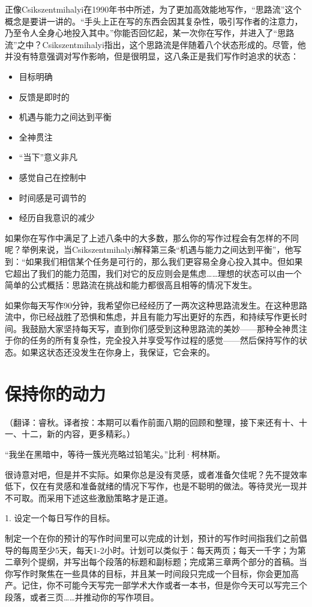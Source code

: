 \documentclass{ctexart}
\begin{document}
正像Csikszentmihalyi在1990年书中所述，为了更加高效能地写作，“思路流”这个概念是要讲一讲的。“手头上正在写的东西会因其复杂性，吸引写作者的注意力，乃至令人全身心地投入其中。”你能否回忆起，某一次你在写作，并进入了“思路流”之中？Csikszentmihalyi指出，这个思路流是伴随着八个状态形成的。尽管，他并没有特意强调对写作影响，但是很明显，这八条正是我们写作时追求的状态：

\begin{itemize}
\item 目标明确
\item 反馈是即时的
\item 机遇与能力之间达到平衡
\item 全神贯注
\item “当下”意义非凡
\item 感觉自己在控制中
\item 时间感是可调节的
\item 经历自我意识的减少
\end{itemize}

如果你在写作中满足了上述八条中的大多数，那么你的写作过程会有怎样的不同呢？举例来说，当Csikszentmihalyi解释第三条“机遇与能力之间达到平衡”，他写到：“如果我们相信某个任务是可行的，那么我们更容易全身心投入其中。但如果它超出了我们的能力范围，我们对它的反应则会是焦虑……理想的状态可以由一个简单的公式概括：思路流在挑战和能力都很高且相等的情况下发生。

如果你每天写作90分钟，我希望你已经经历了一两次这种思路流发生。在这种思路流中，你已经战胜了恐惧和焦虑，并且有能力写出更好的东西，和持续写作更长时间。我鼓励大家坚持每天写，直到你们感受到这种思路流的美妙——那种全神贯注于你的任务的所有复杂性，完全投入并享受写作过程的感觉——然后保持写作的状态。如果这状态还没发生在你身上，我保证，它会来的。

\section{保持你的动力}
（翻译：睿秋。译者按：本期可以看作前面八期的回顾和整理，接下来还有十、十一、十二，新的内容，更多精彩。）

“我坐在黑暗中，等待一簇光亮略过铅笔尖。”比利·柯林斯。

很诗意对吧，但是并不实际。如果你总是没有灵感，或者准备欠佳呢？先不提效率低下，仅在有灵感和准备就绪的情况下写作，也是不聪明的做法。等待灵光一现并不可取。而采用下述这些激励策略才是正道。

1. 设定一个每日写作的目标。

制定一个在你的预计的写作时间里可以完成的计划，预计的写作时间指我们之前倡导的每周至少5天，每天1-2小时。计划可以类似于：每天两页；每天一千字；为第二章列个提纲，并写出每个段落的标题和副标题；完成第三章两个部分的首稿。当你写作时聚焦在一些具体的目标，并且某一时间段只完成一个目标，你会更加高产。记住，你不可能今天写完一部学术大作或者一本书，但是你今天可以写完三个段落，或者三页……并推动你的写作项目。
\end{document}
